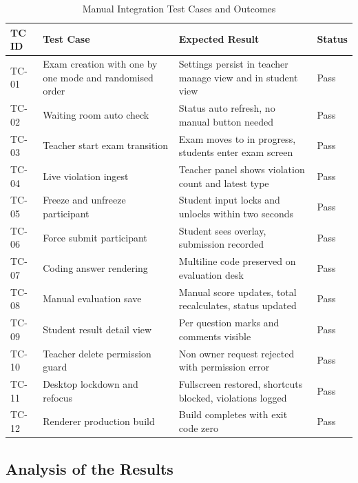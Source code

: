 \documentclass[12pt, a4paper]{report}
\begin{document}
\begin{table}[H]
  \caption{Manual Integration Test Cases and Outcomes}
  \label{tab:4.4}
  \centering
  {\fontsize{10}{13}\selectfont
    \begin{tabular}{|p{0.6in}|p{1.6in}|p{2in}|p{0.7in}|}
      \hline
      \textbf{TC ID} & \textbf{Test Case} & \textbf{Expected Result} & \textbf{Status} \\
      \hline
      TC-01 & Exam creation with one by one mode and randomised order & Settings persist in teacher manage view and in student view & Pass \\
      \hline
      TC-02 & Waiting room auto check & Status auto refresh, no manual button needed & Pass \\
      \hline
      TC-03 & Teacher start exam transition & Exam moves to in progress, students enter exam screen & Pass \\
      \hline
      TC-04 & Live violation ingest & Teacher panel shows violation count and latest type & Pass \\
      \hline
      TC-05 & Freeze and unfreeze participant & Student input locks and unlocks within two seconds & Pass \\
      \hline
      TC-06 & Force submit participant & Student sees overlay, submission recorded & Pass \\
      \hline
      TC-07 & Coding answer rendering & Multiline code preserved on evaluation desk & Pass \\
      \hline
      TC-08 & Manual evaluation save & Manual score updates, total recalculates, status updated & Pass \\
      \hline
      TC-09 & Student result detail view & Per question marks and comments visible & Pass \\
      \hline
      TC-10 & Teacher delete permission guard & Non owner request rejected with permission error & Pass \\
      \hline
      TC-11 & Desktop lockdown and refocus & Fullscreen restored, shortcuts blocked, violations logged & Pass \\
      \hline
      TC-12 & Renderer production build & Build completes with exit code zero & Pass \\
      \hline
    \end{tabular}
  }
\end{table}

\subsection{Analysis of the Results}
\end{document}
